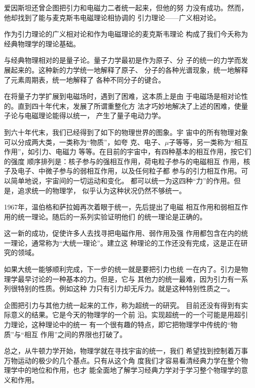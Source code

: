 爱因斯坦还曾企图把引力和电磁力二者统一起来，但他的努
力没有成功。然而，他却找到了能与麦克斯韦电磁理论相协调的
引力理论——广义相对论。

作为引力理论的广义相对论和作为电磁理论的麦克斯韦理论
构成了我们今夭称为经典物理学的理论基础。

与经典物理相对的是量子论。量子力学最初是作为原子、分
子的统一的力学而发展起来的。这种新的力学统一地解释了原子、
分子的各种光谱现象，统一地解释了元素周期表，统一地解释了
各种不同分子的键合。

在将量子力学扩展到电磁场时，遇到了困难，这本质上是由
于电磁场是相对论性的。直到四十年代末，发展了所谓重整化方
法才巧妙地解决了上述的困难，使量子论与电磁理论能得以统一，
产生了量子电动力学。

到六十年代末，我们已经得到了如下的物理世界的图象。宇
宙中的所有物理对象可以分成两大类，一类称为“物质”，如夸
克、电子、\mu $\mu$子等等，另一类称为“相互作用”，如引力、电磁力
等等。在目前的宇宙中，有四种基本的相互作用，按它们的强度
顺序排列是：核子参与的强相互作用，荷电粒子参与的电磁相互
作用，核子及电子、中微子参与的弱相互作用，以及任何粒子都
参与的引力相互作用。可以简单地说，宇宙间的一切运动和变化。
都可以统一为这四种“力”的作用。但是，追求统一的物理学，
似乎认为这种状况仍然不够统一。

1967年，温伯格和萨拉姆再次着眼于统一，先后提出了电磁
相互作用和弱相互作用的统一理论。随后的一系列实验证明他们
的统一理论是正确的。

这一新的成功，促使许多人去找寻把电磁作用、弱作用及强
作用都包含在内的统一理论，通常称为“大统一理论”。建立这
种理论的工作还没有完成，这是正在研究的领域。

如果大统一能够顺利完成，下一步的统一就是要把引力也统
一在内了。引力是物理学最早讨论的一种基本的力。但是，它与
其他力的统一最难，因为引力有一系列很特别的性质。例如这种
力只有引力却无斥力。就是这种特别性质之一。

企图把引力与其他力统一起来的工作，称为超统一的研究。
目前还没有得到有实际意义的结果。它是今天的物理学的一个前
沿。实现超统一的一个可能是用超引力理论，这种理论中的统一
有一个很有趣的特点，即它把物理学中传统的“物质”与“相互
作用”之间的界限也打破了。

总之，从牛顿力学开始，物理学就在寻找宇宙的统一，我们
希望找到控制着万事万物运动的极少的几个基点。只有从这个角
度我们才容易看清经典力学在整个物理学中的地位和作用，也才
能全面地了解学习经典力学对于学习整个物理学的意义和作用。
